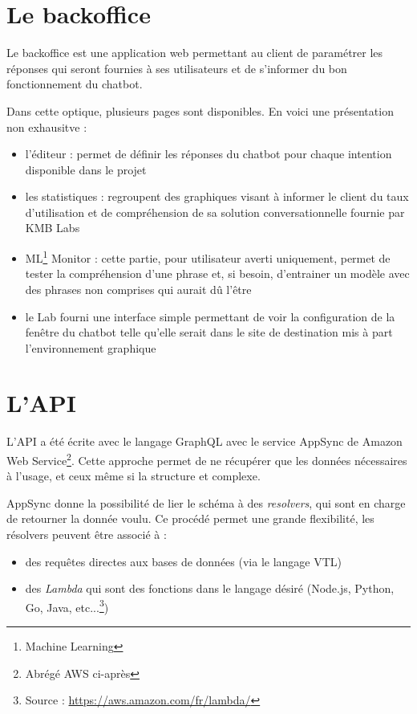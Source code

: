 \documentclass[12pt,a4paper,twoside]{scrreprt}
\begin{document}
\section{Le backoffice}

Le backoffice est une application web permettant au client de paramétrer les réponses qui seront fournies à ses utilisateurs et de s'informer du bon fonctionnement du chatbot.

Dans cette optique, plusieurs pages sont disponibles. En voici une présentation non exhausitve :
\begin{itemize}
\item l'éditeur : permet de définir les réponses du chatbot pour chaque intention disponible dans le projet
\item les statistiques : regroupent des graphiques visant à informer le client du taux d'utilisation et de compréhension de sa solution conversationnelle fournie par KMB Labs
\item ML\footnote{Machine Learning} Monitor : cette partie, pour utilisateur averti uniquement, permet de tester la compréhension d'une phrase et, si besoin, d'entrainer un modèle avec des phrases non comprises qui aurait dû l'être
\item le Lab fourni une interface simple permettant de voir la configuration de la fenêtre du chatbot telle qu'elle serait dans le site de destination mis à part l'environnement graphique
\end{itemize}

\section{L'API}

L'API a été écrite avec le langage GraphQL avec le service AppSync de Amazon Web Service\footnote{Abrégé \og AWS\fg{} ci-après}. Cette approche permet de ne récupérer que les données nécessaires  à l'usage, et ceux même si la structure et complexe.

AppSync donne la possibilité de lier le schéma à des \textit{resolvers}, qui sont en charge de retourner la donnée voulu. Ce procédé permet une grande flexibilité, les résolvers peuvent être associé à :
\begin{itemize}
	\item des requêtes directes aux bases de données (via le langage VTL)
	\item des \textit{Lambda} qui sont des fonctions dans le langage désiré (Node.js, Python, Go, Java, etc...\footnote{Source : \url{https://aws.amazon.com/fr/lambda/}})
\end{itemize}
\end{document}
